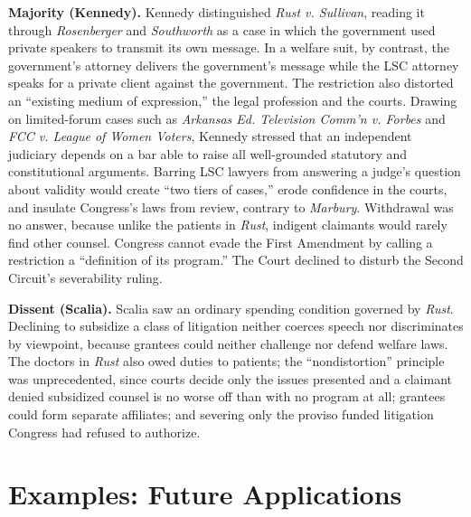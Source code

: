 \documentclass[12pt]{article}
\begin{document}
\textbf{Majority (Kennedy).} Kennedy distinguished \textit{Rust v. Sullivan}, reading it through \textit{Rosenberger} and \textit{Southworth} as a case in which the government used private speakers to transmit its own message. In a welfare suit, by contrast, the government's attorney delivers the government's message while the LSC attorney speaks for a private client against the government. The restriction also distorted an ``existing medium of expression,'' the legal profession and the courts. Drawing on limited-forum cases such as \textit{Arkansas Ed. Television Comm'n v. Forbes} and \textit{FCC v. League of Women Voters}, Kennedy stressed that an independent judiciary depends on a bar able to raise all well-grounded statutory and constitutional arguments. Barring LSC lawyers from answering a judge's question about validity would create ``two tiers of cases,'' erode confidence in the courts, and insulate Congress's laws from review, contrary to \textit{Marbury}. Withdrawal was no answer, because unlike the patients in \textit{Rust}, indigent claimants would rarely find other counsel. Congress cannot evade the First Amendment by calling a restriction a ``definition of its program.'' The Court declined to disturb the Second Circuit's severability ruling.

\textbf{Dissent (Scalia).} Scalia saw an ordinary spending condition governed by \textit{Rust}. Declining to subsidize a class of litigation neither coerces speech nor discriminates by viewpoint, because grantees could neither challenge nor defend welfare laws. The doctors in \textit{Rust} also owed duties to patients; the ``nondistortion'' principle was unprecedented, since courts decide only the issues presented and a claimant denied subsidized counsel is no worse off than with no program at all; grantees could form separate affiliates; and severing only the proviso funded litigation Congress had refused to authorize.

\section{Examples: Future Applications}
\end{document}
